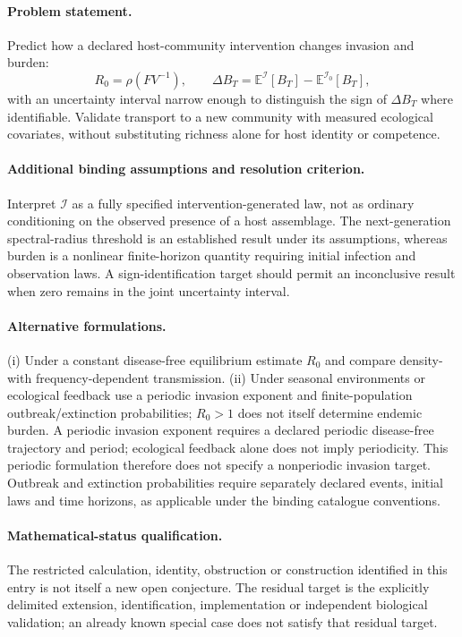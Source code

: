 \documentclass[11pt]{article}
\begin{document}
\paragraph{Problem statement.} Predict how a declared host-community intervention changes invasion and burden:
\[
 R_0=\rho(FV^{-1}),\qquad
 \Delta B_T=\mathbb{E}^{\mathcal I}[B_T]-\mathbb{E}^{\mathcal I_0}[B_T],
\]
with an uncertainty interval narrow enough to distinguish the sign of $\Delta B_T$ where identifiable. Validate transport to a new community with measured ecological covariates, without substituting richness alone for host identity or competence.
\paragraph{Additional binding assumptions and resolution criterion.} Interpret $\mathcal I$ as a fully specified intervention-generated law, not as ordinary conditioning on the observed presence of a host assemblage. The next-generation spectral-radius threshold is an established result under its assumptions, whereas burden is a nonlinear finite-horizon quantity requiring initial infection and observation laws. A sign-identification target should permit an inconclusive result when zero remains in the joint uncertainty interval.

\paragraph{Alternative formulations.} (i) Under a constant disease-free equilibrium estimate $R_0$ and compare density- with frequency-dependent transmission. (ii) Under seasonal environments or ecological feedback use a periodic invasion exponent and finite-population outbreak/extinction probabilities; $R_0>1$ does not itself determine endemic burden. A periodic invasion exponent requires a declared periodic disease-free trajectory and period; ecological feedback alone does not imply periodicity. This periodic formulation therefore does not specify a nonperiodic invasion target. Outbreak and extinction probabilities require separately declared events, initial laws and time horizons, as applicable under the binding catalogue conventions.
\paragraph{Mathematical-status qualification.} The restricted calculation, identity, obstruction or construction identified in this entry is not itself a new open conjecture. The residual target is the explicitly delimited extension, identification, implementation or independent biological validation; an already known special case does not satisfy that residual target.
\end{document}
